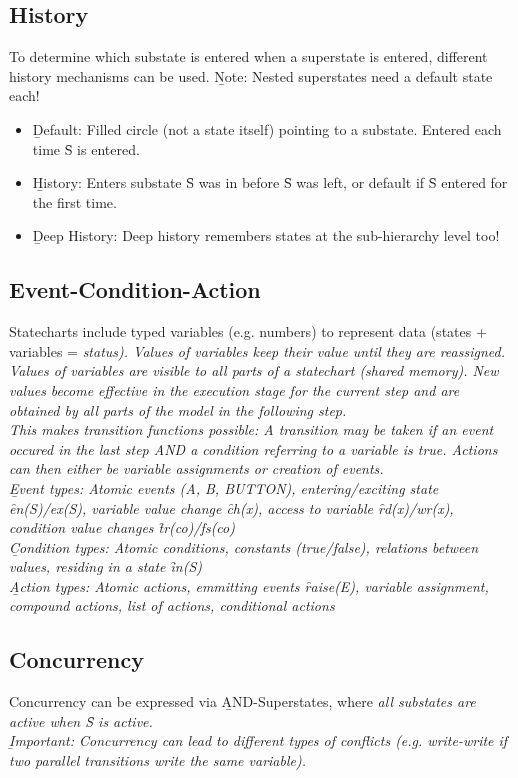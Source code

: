 \subsection{History}
To determine which substate is entered when a superstate is entered, different history mechanisms can be used. \b{Note:} Nested superstates need a default state each!
\begin{itemize}
    \item \b{Default:} Filled circle (not a state itself) pointing to a substate. Entered each time \f{S} is entered.
    \item \b{History:} Enters substate \f{S} was in before \f{S} was left, or default if \f{S} entered for the first time.
    \item \b{Deep History:} Deep history remembers states at the sub-hierarchy level too!
\end{itemize}

\subsection{Event-Condition-Action}
Statecharts include typed variables (e.g. numbers) to represent data (states + variables = \it{status}). Values of variables keep their value until they are reassigned. Values of variables are visible to all parts of a statechart (shared memory). New values become effective in the execution stage for the current step and are obtained by all parts of the model in the \it{following} step.\\[0.5em]
This makes transition functions possible: A transition may be taken if an event occured in the last step AND a condition referring to a variable is true. Actions can then either be variable assignments or creation of events.\\

\b{Event types:} Atomic events (A, B, BUTTON), entering/exciting state \f{en(S)/ex(S)}, variable value change \f{ch(x)}, access to variable \f{rd(x)/wr(x)}, condition value changes \f{tr(co)/fs(co)}\\

\b{Condition types:} Atomic conditions, constants (true/false), relations between values, residing in a state \f{in(S)}\\

\b{Action types:} Atomic actions, emmitting events \f{raise(E)}, variable assignment, compound actions, list of actions, conditional actions

\subsection{Concurrency}
Concurrency can be expressed via \b{AND}-Superstates, where \it{all} substates are active when \f{S} is active.\\[0.5em]
\b{Important}: Concurrency can lead to different types of conflicts (e.g. write-write if two parallel transitions write the same variable). 

